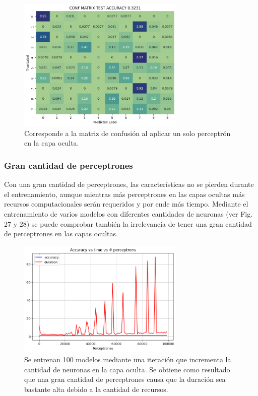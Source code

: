 \documentclass[journal]{IEEEtai}
\begin{document}
\begin{figure}[H]
\centering
\includegraphics[width=8cm]{img/exp/1p.png}
\caption{Corresponde a la matriz de confusión al aplicar un solo perceptrón en la capa oculta.}
\label{fig: 1p}
\end{figure}

\subsubsection{Gran cantidad de perceptrones}

Con una gran cantidad de perceptrones, las características no se pierden durante el entrenamiento, aunque mientras más perceptrones en las capas ocultas más recursos computacionales serán requeridos y por ende más tiempo. Mediante el entrenamiento de varios modelos con diferentes cantidades de neuronas (ver Fig. 27 y 28) se puede comprobar también la irrelevancia de tener una gran cantidad de perceptrones en las capas ocultas.

\begin{figure}[H]
\centering
\includegraphics[width=8cm]{img/exp/hipperExpBig.png}
\caption{Se entrenan 100 modelos mediante una iteración que incrementa la cantidad de neuronas en la capa oculta. Se obtiene como resultado que una gran cantidad de perceptrones causa que la duración sea bastante alta debido a la cantidad de recursos.}
\label{fig: expBig}
\end{figure}
\end{document}
